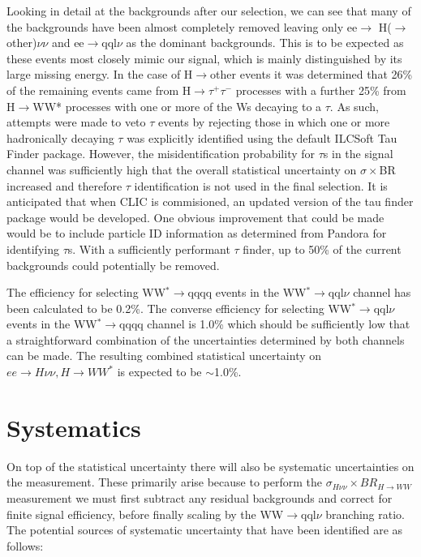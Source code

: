 Looking in detail at the backgrounds after our selection, we can see that many of the backgrounds have been almost completely removed leaving only ee$\rightarrow$ H($\rightarrow$ other)$\nu\nu$ and ee$\rightarrow$qql$\nu$ as the dominant backgrounds. This is to be expected as these events most closely mimic our signal, which is mainly distinguished by its large missing energy. In the case of H$\rightarrow$other events it was determined that 26\% of the remaining events came from H$\rightarrow\tau^+\tau^-$ processes with a further 25\% from H$\rightarrow$WW* processes with one or more of the Ws decaying to a $\tau$. As such, attempts were made to veto $\tau$ events by rejecting those in which one or more hadronically decaying $\tau$ was explicitly identified using the default ILCSoft Tau Finder \cite{TauFinder} package. However, the misidentification probability for $\tau$s in the signal channel was sufficiently high that the overall statistical uncertainty on $\sigma \times$BR increased and therefore $\tau$ identification is not used in the final selection. It is anticipated that when \ac{CLIC} is commisioned, an updated version of the tau finder package would be developed. One obvious improvement that could be made would be to include particle ID information as determined from Pandora for identifying $\tau$s. With a sufficiently performant $\tau$ finder, up to 50\% of the current backgrounds could potentially be removed. 

The efficiency for selecting WW$^*\rightarrow$qqqq events in the WW$^*\rightarrow$qql$\nu$ channel has been calculated to be 0.2\%. The converse efficiency for selecting WW$^*\rightarrow$qql$\nu$ events in the WW$^*\rightarrow$qqqq channel is 1.0\% which should be sufficiently low that a straightforward combination of the uncertainties determined by both channels can be made. The resulting combined statistical uncertainty on $ee\rightarrow H\nu\nu, H\rightarrow WW^*$ is expected to be $\sim$1.0\%.


\section{Systematics}
\label{higgsSystematics}
On top of the statistical uncertainty there will also be systematic uncertainties on the measurement. These primarily arise because to perform the $\sigma_{H\nu\nu}\times BR_{H\rightarrow WW}$ measurement we must first subtract any residual backgrounds and correct for finite signal efficiency, before finally scaling by the WW$\rightarrow$qql$\nu$ branching ratio. The potential sources of systematic uncertainty that have been identified are as follows:

